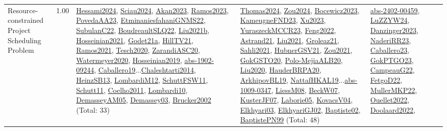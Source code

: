 {\begin{longtable}{p{3cm}r>{\raggedright\arraybackslash}p{6cm}>{\raggedright\arraybackslash}p{6cm}>{\raggedright\arraybackslash}p{8cm}}
\index{Resource-constrained Project Scheduling Problem}\index{Classification!Resource-constrained Project Scheduling Problem}Resource-constrained Project Scheduling Problem &  1.00 & \hyperref[detail:Hessami2024]{Hessami2024}, \hyperref[detail:Sciau2024]{Sciau2024}, \hyperref[detail:Akan2023]{Akan2023}, \hyperref[detail:Ramos2023]{Ramos2023}, \hyperref[detail:PovedaAA23]{PovedaAA23}, \hyperref[detail:EtminaniesfahaniGNMS22]{EtminaniesfahaniGNMS22}, \hyperref[detail:SubulanC22]{SubulanC22}, \hyperref[detail:BoudreaultSLQ22]{BoudreaultSLQ22}, \hyperref[detail:Liu2021b]{Liu2021b}, \hyperref[detail:Hosseinian2021]{Hosseinian2021}, \hyperref[detail:Godet21a]{Godet21a}, \hyperref[detail:HillTV21]{HillTV21}, \hyperref[detail:Ramos2021]{Ramos2021}, \hyperref[detail:Tesch2020]{Tesch2020}, \hyperref[detail:ZarandiASC20]{ZarandiASC20}, \hyperref[detail:Watermeyer2020]{Watermeyer2020}, \hyperref[detail:Hosseinian2019]{Hosseinian2019}, \hyperref[detail:abs-1902-09244]{abs-1902-09244}, \hyperref[detail:Caballero19]{Caballero19}...\hyperref[detail:Chaleshtarti2014]{Chaleshtarti2014}, \hyperref[detail:HeinzSB13]{HeinzSB13}, \hyperref[detail:LombardiM12]{LombardiM12}, \hyperref[detail:SchuttFSW11]{SchuttFSW11}, \hyperref[detail:Schutt11]{Schutt11}, \hyperref[detail:Coelho2011]{Coelho2011}, \hyperref[detail:Lombardi10]{Lombardi10}, \hyperref[detail:DemasseyAM05]{DemasseyAM05}, \hyperref[detail:Demassey03]{Demassey03}, \hyperref[detail:Brucker2002]{Brucker2002} (Total: 33) & \hyperref[detail:Thomas2024]{Thomas2024}, \hyperref[detail:Zou2024]{Zou2024}, \hyperref[detail:Bocewicz2023]{Bocewicz2023}, \hyperref[detail:KameugneFND23]{KameugneFND23}, \hyperref[detail:Xu2023]{Xu2023}, \hyperref[detail:YuraszeckMCCR23]{YuraszeckMCCR23}, \hyperref[detail:Feng2022]{Feng2022}, \hyperref[detail:Astrand21]{Astrand21}, \hyperref[detail:Liu2021]{Liu2021}, \hyperref[detail:Groleaz21]{Groleaz21}, \hyperref[detail:Sahli2021]{Sahli2021}, \hyperref[detail:HubnerGSV21]{HubnerGSV21}, \hyperref[detail:Zou2021]{Zou2021}, \hyperref[detail:GokGSTO20]{GokGSTO20}, \hyperref[detail:Polo-MejiaALB20]{Polo-MejiaALB20}, \hyperref[detail:Liu2020]{Liu2020}, \hyperref[detail:HauderBRPA20]{HauderBRPA20}, \hyperref[detail:ArkhipovBL19]{ArkhipovBL19}, \hyperref[detail:NattafHKAL19]{NattafHKAL19}...\hyperref[detail:abs-1009-0347]{abs-1009-0347}, \hyperref[detail:LiessM08]{LiessM08}, \hyperref[detail:BeckW07]{BeckW07}, \hyperref[detail:KusterJF07]{KusterJF07}, \hyperref[detail:Laborie05]{Laborie05}, \hyperref[detail:KovacsV04]{KovacsV04}, \hyperref[detail:Elkhyari03]{Elkhyari03}, \hyperref[detail:ElkhyariGJ02]{ElkhyariGJ02}, \hyperref[detail:Baptiste02]{Baptiste02}, \hyperref[detail:BaptistePN99]{BaptistePN99} (Total: 48) & \hyperref[detail:abs-2402-00459]{abs-2402-00459}, \hyperref[detail:LuZZYW24]{LuZZYW24}, \hyperref[detail:Danzinger2023]{Danzinger2023}, \hyperref[detail:NaderiRR23]{NaderiRR23}, \hyperref[detail:Caballero23]{Caballero23}, \hyperref[detail:GokPTGO23]{GokPTGO23}, \hyperref[detail:CampeauG22]{CampeauG22}, \hyperref[detail:FetgoD22]{FetgoD22}, \hyperref[detail:MullerMKP22]{MullerMKP22}, \hyperref[detail:Ouellet2022]{Ouellet2022}, \hyperref[detail:Doolaard2022]{Doolaard2022}, 
\end{longtable}}
